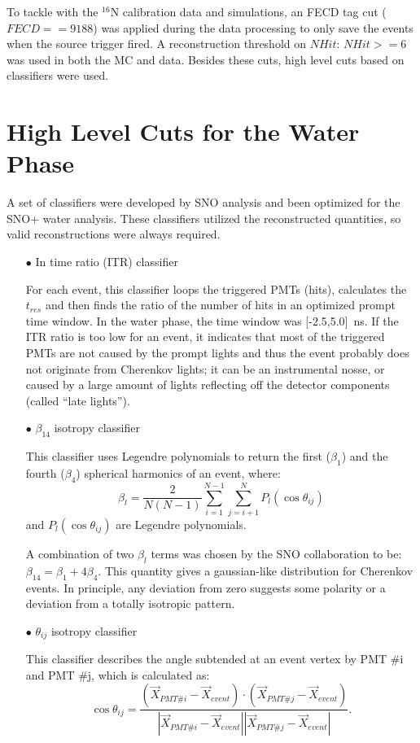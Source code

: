To tackle with the $^{16}$N calibration data and simulations, an FECD tag cut ($FECD==9188$) was applied during the data processing to only save the events when the source trigger fired. A reconstruction threshold on $NHit$: $NHit>=6$ was used in both the MC and data. Besides these cuts, high level cuts based on classifiers were used. 

\section{High Level Cuts for the Water Phase}\label{sect:high_level_cuts}
A set of classifiers were developed by SNO analysis and been optimized for the SNO+ water analysis\cite{highlevel}. These classifiers utilized the reconstructed quantities, so valid reconstructions were always required.

\begin{itemize}
	\item[$\bullet$] In time ratio (ITR) classifier
	
	For each event, this classifier loops the triggered PMTs (hits), calculates the $t_{res}$ and then finds the ratio of the number of hits in an optimized prompt time window. In the water phase, the time window was [-2.5,5.0]~ns. If the ITR ratio is too low for an event, it indicates that most of the triggered PMTs are not caused by the prompt lights and thus the event probably does not originate from Cherenkov lights; it can be an instrumental nosse, or caused by a large amount of lights reflecting off the detector components (called ``late lights''). 
	
	\item[$\bullet$] $\beta_{14}$ isotropy classifier
	
	This classifier uses Legendre polynomials to return the	first ($\beta_1$) and the fourth ($\beta_4$) spherical harmonics of an event, where:
	\[
	\beta_l = \frac{2}{N(N-1)}\sum_{i=1}^{N-1}\sum_{j=i+1}^N P_l(\cos\theta_{ij})
	\]
	and $P_l(\cos\theta_{ij})$ are Legendre polynomials. 
	
	A combination of two $\beta_l$ terms was chosen by the SNO collaboration to be: $\beta_{14}=\beta_1+4\beta_4$. This quantity gives a gaussian-like distribution for Cherenkov events\cite{dunmore2004separation}.	In principle, any deviation from zero suggests some polarity or a deviation from a totally isotropic pattern.
	
	\item[$\bullet$] $\theta_{ij}$ isotropy classifier 
	
	This classifier describes the angle subtended at an event vertex by PMT \#i and PMT \#j, which is calculated as:
	\begin{equation}
	\cos\theta_{ij}=\frac{(\vec{X}_{PMT\#i}- \vec{X}_{event})\cdot (\vec{X}_{PMT\#j}- \vec{X}_{event})}{|\vec{X}_{PMT\#i}- \vec{X}_{event}||\vec{X}_{PMT\#j}- \vec{X}_{event}|}.
	\end{equation}
\end{itemize}

